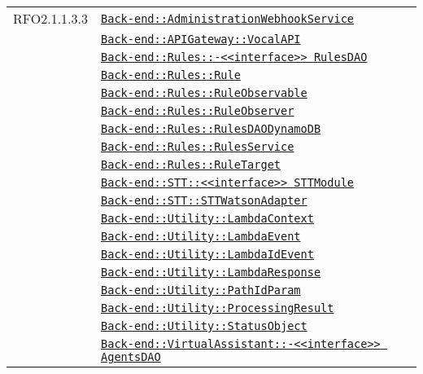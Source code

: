 \begin{longtable}{|>{\centering}m{3cm}|m{10cm}<{\centering}|}
RFO2.1.1.3.3 & \hyperref[Back-end::AdministrationWebhookService]{\texttt{Back-end::AdministrationWebhookService}}\\
& \hyperref[Back-end::APIGateway::VocalAPI]{\texttt{Back-end::APIGateway::VocalAPI}}\\
& \hyperref[Back-end::Rules::<<interface>> RulesDAO]{\texttt{Back-end::Rules::-\linebreak <<interface>> RulesDAO}}\\
& \hyperref[Back-end::Rules::Rule]{\texttt{Back-end::Rules::Rule}}\\
& \hyperref[Back-end::Rules::RuleObservable]{\texttt{Back-end::Rules::RuleObservable}}\\
& \hyperref[Back-end::Rules::RuleObserver]{\texttt{Back-end::Rules::RuleObserver}}\\
& \hyperref[Back-end::Rules::RulesDAODynamoDB]{\texttt{Back-end::Rules::RulesDAODynamoDB}}\\
& \hyperref[Back-end::Rules::RulesService]{\texttt{Back-end::Rules::RulesService}}\\
& \hyperref[Back-end::Rules::RuleTarget]{\texttt{Back-end::Rules::RuleTarget}}\\
& \hyperref[Back-end::STT::<<interface>> STTModule]{\texttt{Back-end::STT::<<interface>> STTModule}}\\
& \hyperref[Back-end::STT::STTWatsonAdapter]{\texttt{Back-end::STT::STTWatsonAdapter}}\\
& \hyperref[Back-end::Utility::LambdaContext]{\texttt{Back-end::Utility::LambdaContext}}\\
& \hyperref[Back-end::Utility::LambdaEvent]{\texttt{Back-end::Utility::LambdaEvent}}\\
& \hyperref[Back-end::Utility::LambdaIdEvent]{\texttt{Back-end::Utility::LambdaIdEvent}}\\
& \hyperref[Back-end::Utility::LambdaResponse]{\texttt{Back-end::Utility::LambdaResponse}}\\
& \hyperref[Back-end::Utility::PathIdParam]{\texttt{Back-end::Utility::PathIdParam}}\\
& \hyperref[Back-end::Utility::ProcessingResult]{\texttt{Back-end::Utility::ProcessingResult}}\\
& \hyperref[Back-end::Utility::StatusObject]{\texttt{Back-end::Utility::StatusObject}}\\
& \hyperref[Back-end::VirtualAssistant::<<interface>> AgentsDAO]{\texttt{Back-end::VirtualAssistant::-\linebreak <<interface>> AgentsDAO}}\\

\end{longtable}
